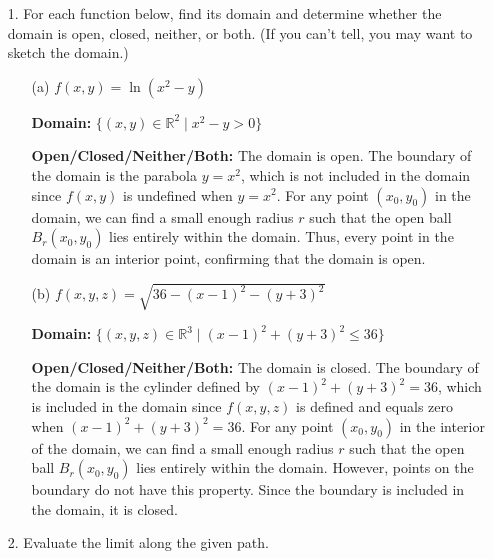 \documentclass[reqno, 12pt]{amsart}
\begin{document}
\newpage
\begin{itemize}
  \item[1.] For each function below, find its domain and determine whether the domain is open, closed, neither, or both. (If you can't tell, you may want to sketch the domain.)
    \medskip

    \begin{itemize}
      \item[(a)] $f(x,y) = \ln(x^2-y)$
        \newline

        \begin{answerbox}
            \textbf{Domain:} $\{(x,y) \in \mathbb{R}^2 \mid x^2 - y > 0\}$
    
            \textbf{Open/Closed/Neither/Both:} The domain is open. The boundary of the domain is the parabola $y = x^2$, which is not included in the domain since $f(x,y)$ is undefined when $y = x^2$. For any point $(x_0, y_0)$ in the domain, we can find a small enough radius $r$ such that the open ball $B_r(x_0, y_0)$ lies entirely within the domain. Thus, every point in the domain is an interior point, confirming that the domain is open.
        \end{answerbox}
        \vspace{0.5 in}

      \item[(b)] $f(x,y,z) = \sqrt{36-(x-1)^2-(y+3)^2}$
      \newline

        \begin{answerbox}
            \textbf{Domain:} $\{(x,y,z) \in \mathbb{R}^3 \mid (x-1)^2 + (y+3)^2 \leq 36\}$
    
            \textbf{Open/Closed/Neither/Both:} The domain is closed. The boundary of the domain is the cylinder defined by $(x-1)^2 + (y+3)^2 = 36$, which is included in the domain since $f(x,y,z)$ is defined and equals zero when $(x-1)^2 + (y+3)^2 = 36$. For any point $(x_0, y_0)$ in the interior of the domain, we can find a small enough radius $r$ such that the open ball $B_r(x_0, y_0)$ lies entirely within the domain. However, points on the boundary do not have this property. Since the boundary is included in the domain, it is closed.
        \end{answerbox}
        \vspace{0.5 in}
    \end{itemize}

    \newpage
  \item[2.] Evaluate the limit along the given path.


\end{itemize}
\end{document}
